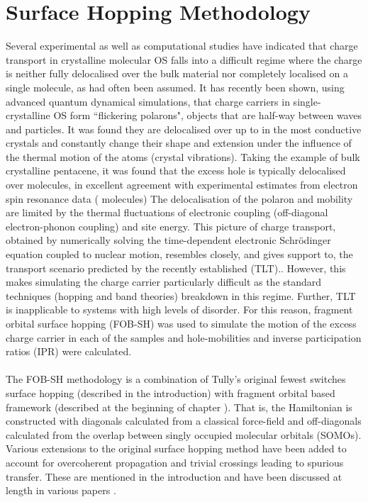 \section{Surface Hopping Methodology}
Several experimental as well as computational studies have indicated that charge transport in crystalline molecular OS falls into a difficult regime where the charge is neither fully delocalised over the bulk material nor completely localised on a single molecule, as had often been assumed.\cite{Vehoff2010,Deng2004,Kwiatkowski2009,Athanasopoulos2007,Vehoff2010_2,Kordt2016,Zhang2019} It has recently been shown, using advanced quantum dynamical simulations, that charge carriers in single-crystalline OS form ``flickering polarons", objects that are half-way between waves and particles\cite{FlickPolarons,Giannini2019,Ziogos20}. It was found they are delocalised over up to  in the most conductive crystals and constantly change their shape and extension under the influence of the thermal motion of the atoms (crystal vibrations).  Taking the example of bulk crystalline pentacene, it was found that the excess hole is typically delocalised over  molecules, in excellent agreement with experimental estimates from electron spin resonance data ( molecules) The delocalisation of the polaron and mobility are limited by the thermal fluctuations of electronic coupling (off-diagonal electron-phonon coupling) and site energy. This picture of charge transport, obtained by numerically solving the time-dependent electronic Schr\"odinger equation coupled to nuclear motion, resembles closely, and gives support to, the transport scenario predicted by the recently established  (TLT).\cite{Nematiaram2019,PhysRevB.83.081202}. However, this makes simulating the charge carrier particularly difficult as the  standard techniques (hopping and band theories) breakdown in this regime. Further, TLT is inapplicable to systems with high levels of disorder. For this reason, fragment orbital surface hopping (FOB-SH) was used to simulate the motion of the excess charge carrier in each of the samples and hole-mobilities and inverse participation ratios (IPR) were calculated.
\\\\
The FOB-SH methodology is a combination of Tully's original fewest switches surface hopping (described in the introduction) with fragment orbital based framework (described at the beginning of chapter \label{chap:molecular_systems}). That is, the Hamiltonian is constructed with diagonals calculated from a classical force-field and off-diagonals calculated from the overlap between singly occupied molecular orbitals (SOMOs). Various extensions to the original surface hopping method have been added to account for overcoherent propagation and trivial crossings leading to spurious transfer. These are mentioned in the introduction and have been discussed at length in various papers \cite{Giannini2018Crossover,Carof2017FSSH,C9FD00046A,C9CP04770K,C9TC05270D,FlickPolarons,FOB-SH_Spencer}.

